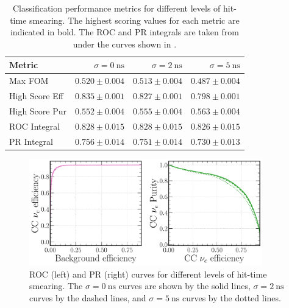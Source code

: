 \begin{table} %
    \begin{tabular}{lrrr}
        Metric         & $\sigma=0~\text{ns}$ & $\sigma=2~\text{ns}$ & $\sigma=5~\text{ns}$ \\
        \midrule
        Max FOM        & \textbf{$0.520\pm0.004$} & $0.513\pm0.004$  & $0.487\pm0.004$      \\
        High Score Eff & \textbf{$0.835\pm0.001$} & $0.827\pm0.001$  & $0.798\pm0.001$      \\
        High Score Pur & $0.552\pm0.004$          & $0.555\pm0.004$  & \textbf{$0.563\pm0.004$} \\
        ROC Integral   & \textbf{$0.828\pm0.015$} & $0.828\pm0.015$  & $0.826\pm0.015$      \\
        PR Integral    & \textbf{$0.756\pm0.014$} & $0.751\pm0.014$  & $0.730\pm0.013$      \\
    \end{tabular}
    \caption[Classification performance metrics for different levels of hit-time smearing]
    {Classification performance metrics for different levels of hit-time smearing. The highest
        scoring values for each metric are indicated in bold. The ROC and PR integrals are taken
        from under the curves shown in .}
    \label{tab:calib_time}
\end{table}

\begin{figure} %
    \includegraphics[width=0.9\textwidth]{diagrams/7-results/calib_time_nuel_comp_curves.pdf}
    \caption[Receiver operating characteristic and precision-recall curves for different levels of
        hit-time smearing] {ROC (left) and PR (right) curves for different levels of hit-time
        smearing. The $\sigma=0~\text{ns}$ curves are shown by the solid lines,
        $\sigma=2~\text{ns}$ curves by the dashed lines, and $\sigma=5~\text{ns}$ curves by the
        dotted lines.}
    \label{fig:calib_time_nuel_comp_curves}
\end{figure}

